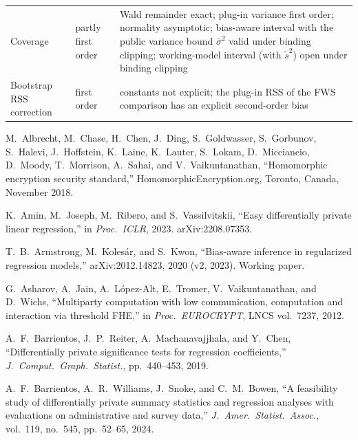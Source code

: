 \documentclass[11pt]{article}
\theoremstyle{definition}
\theoremstyle{plain}
\begin{document}
{\begin{xltabular}{\textwidth}{@{}>{\raggedright\arraybackslash}p{4.4cm}>{\raggedright\arraybackslash}p{2.6cm}>{\raggedright\arraybackslash}X@{}}
Coverage & partly first order & Wald remainder exact; plug-in variance first order; normality asymptotic; bias-aware interval with the public variance bound $\bar\sigma^2$ valid under binding clipping; working-model interval (with $\tilde s^2$) open under binding clipping \\
Bootstrap RSS correction & first order & constants not explicit; the plug-in RSS of the FWS comparison has an explicit second-order bias \\
\bottomrule
\end{xltabular}}

\begin{thebibliography}{99}

M.~Albrecht, M.~Chase, H.~Chen, J.~Ding, S.~Goldwasser, S.~Gorbunov, S.~Halevi, J.~Hoffstein, K.~Laine, K.~Lauter, S.~Lokam, D.~Micciancio, D.~Moody, T.~Morrison, A.~Sahai, and V.~Vaikuntanathan,
``Homomorphic encryption security standard,''
HomomorphicEncryption.org, Toronto, Canada, November 2018.

K.~Amin, M.~Joseph, M.~Ribero, and S.~Vassilvitskii,
``Easy differentially private linear regression,''
in \textit{Proc.\ ICLR}, 2023. arXiv:2208.07353.

T.~B.~Armstrong, M.~Koles\'ar, and S.~Kwon,
``Bias-aware inference in regularized regression models,''
arXiv:2012.14823, 2020 (v2, 2023). Working paper.

G.~Asharov, A.~Jain, A.~L\'opez-Alt, E.~Tromer, V.~Vaikuntanathan, and D.~Wichs,
``Multiparty computation with low communication, computation and interaction via threshold FHE,''
in \textit{Proc.\ EUROCRYPT}, LNCS vol.~7237, 2012.

A.~F.~Barrientos, J.~P.~Reiter, A.~Machanavajjhala, and Y.~Chen,
``Differentially private significance tests for regression coefficients,''
\textit{J.\ Comput.\ Graph.\ Statist.}, pp.\ 440--453, 2019.

A.~F.~Barrientos, A.~R.~Williams, J.~Snoke, and C.~M.~Bowen,
``A feasibility study of differentially private summary statistics and regression analyses with evaluations on administrative and survey data,''
\textit{J.\ Amer.\ Statist.\ Assoc.}, vol.~119, no.~545, pp.\ 52--65, 2024.


\end{thebibliography}
\end{document}
